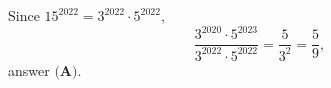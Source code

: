 Since $15^{2022}=3^{2022}\cdot5^{2022}$,
\[\dfrac{3^{2020}\cdot5^{2023}}{3^{2022}\cdot5^{2022}}=\dfrac{5}{3^2}=\boxed{\dfrac59},\]
answer $\textbf{(A)}$.
